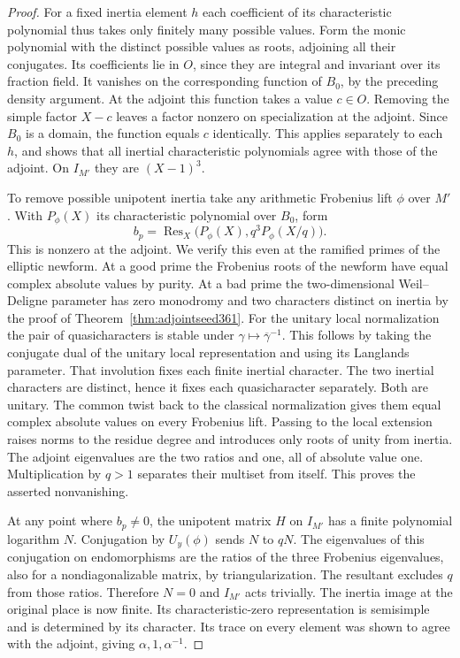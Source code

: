 \documentclass[a4paper,11pt]{article}
\theoremstyle{definition}
\theoremstyle{remark}
\numberwithin{equation}{section}
\begin{document}
\begin{proof}
For a fixed inertia element \(h\) each coefficient of its
characteristic polynomial thus takes only finitely many possible
values. Form the monic polynomial with the distinct possible
values as roots, adjoining all their conjugates. Its coefficients
lie in \(O\), since they are integral and invariant over its
fraction field. It vanishes on the corresponding function of
\(B_0\), by the preceding density argument. At the adjoint this
function takes a value \(c\in O\). Removing the simple factor
\(X-c\) leaves a factor nonzero on specialization at the
adjoint. Since \(B_0\) is a domain, the function equals \(c\)
identically. This applies separately to each \(h\), and shows
that all inertial characteristic polynomials agree with those
of the adjoint. On \(I_{M'}\) they are \((X-1)^3\).

To remove possible unipotent inertia take any arithmetic
Frobenius lift \(\phi\) over \(M'\). With \(P_\phi(X)\) its
characteristic polynomial over \(B_0\), form
\[
           b_p=\operatorname{Res}_X
                    \big(P_\phi(X),q^3 P_\phi(X/q)\big).
\]
This is nonzero at the adjoint. We verify this even at the
ramified primes of the elliptic newform. At a good prime the
Frobenius roots of the newform have equal complex absolute
values by purity. At a bad prime the two-dimensional
Weil--Deligne parameter has zero monodromy and two characters
distinct on inertia by the proof of Theorem~\ref{thm:adjointseed361}.
For the unitary local normalization the pair of quasicharacters
is stable under \(\gamma\mapsto\overline{\gamma}^{-1}\).
This follows by taking the conjugate dual of the unitary local
representation and using its Langlands parameter. That
involution fixes each finite inertial character. The two
inertial characters are distinct, hence it fixes each
quasicharacter separately. Both are unitary. The common twist
back to the classical normalization gives them equal complex
absolute values on every Frobenius lift. Passing to the local
extension raises norms to the residue degree and introduces
only roots of unity from inertia. The adjoint eigenvalues are
the two ratios and one, all of absolute value one. Multiplication
by \(q>1\) separates their multiset from itself. This proves
the asserted nonvanishing.~\cite{VII-V-VI-deligne40,VII-V-V-newforms,VII-V-I-compat123}

At any point where \(b_p\ne0\), the unipotent matrix \(H\) on
\(I_{M'}\) has a finite polynomial logarithm \(N\).
Conjugation by \(U_y(\phi)\) sends \(N\) to \(qN\). The
eigenvalues of this conjugation on endomorphisms are the ratios
of the three Frobenius eigenvalues, also for a nondiagonalizable
matrix, by triangularization. The resultant excludes \(q\)
from those ratios. Therefore \(N=0\) and \(I_{M'}\) acts
trivially. The inertia image at the original place is now
finite. Its characteristic-zero representation is semisimple
and is determined by its character. Its trace on every
element was shown to agree with the adjoint, giving
\(\alpha,1,\alpha^{-1}\).


\end{proof}
\end{document}
